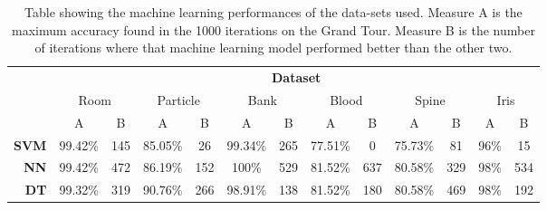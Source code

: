 \documentclass[a4paper,11pt,twoside]{article}
\begin{document}
\begin{table}[h]
\caption{Table showing the machine learning performances of the data-sets used. Measure A is the maximum accuracy found in the 1000 iterations on the Grand Tour. Measure B is the number of iterations where that machine learning model performed better than the other two.}
\begin{tabular}{r|c|c|c|c|c|c|c|c|c|c|c|c|} 
\cline{2-13}

\multicolumn{1}{l|}{}              & \multicolumn{12}{c|}{\textbf{Dataset}}                                                                                                                                      \\ \cline{2-13} 
\multicolumn{1}{l|}{}              & \multicolumn{2}{c|}{Room} & \multicolumn{2}{c|}{Particle} & \multicolumn{2}{c|}{Bank} & \multicolumn{2}{c|}{Blood} & \multicolumn{2}{c|}{Spine} & \multicolumn{2}{c|}{Iris} \\ \cline{2-13} 
                                   & A             & B         & A               & B           & A             & B         & A              & B         & A              & B         & A            & B          \\ \hline
\multicolumn{1}{|r|}{\textbf{SVM}} & 99.42\%       & 145       & 85.05\%         & 26          & 99.34\%       & 265       & 77.51\%        & 0         & 75.73\%        & 81        & 96\%         & 15         \\ \hline
\multicolumn{1}{|r|}{\textbf{NN}}  & 99.42\%       & 472       & 86.19\%         & 152         & 100\%         & 529       & 81.52\%        & 637       & 80.58\%        & 329       & 98\%         & 534        \\ \hline
\multicolumn{1}{|r|}{\textbf{DT}}  & 99.32\%       & 319       & 90.76\%         & 266         & 98.91\%       & 138       & 81.52\%        & 180       & 80.58\%        & 469       & 98\%         & 192        \\ \hline

\end{tabular}
\end{table}
\end{document}
